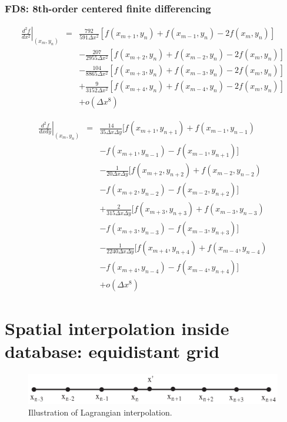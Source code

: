 \documentclass[11pt]{article}
\def\bea{\begin{eqnarray}}
\def\eea{\end{eqnarray}}
\begin{document}
\subsubsection*{FD8: 8th-order centered finite differencing}
\bea \left.\frac{d^2f}{dx^2}\right|_{(x_m,y_n)}
&=& \frac{792}{591\Delta
x^2}[f(x_{m+1},y_n)+f(x_{m-1},y_n)-2f(x_m,y_n)]\nonumber\\
&&-\frac{207}{2955\Delta
x^2}[f(x_{m+2},y_n)+f(x_{m-2},y_n)-2f(x_m,y_n)]\nonumber\\
&&-\frac{104}{8865\Delta
x^2}[f(x_{m+3},y_n)+f(x_{m-3},y_n)-2f(x_m,y_n)]\nonumber\\
&&+\frac{9}{3152\Delta
x^2}[f(x_{m+4},y_n)+f(x_{m-4},y_n)-2f(x_m,y_n)]\nonumber\\
&&+o(\Delta x^8) \eea

\bea \left.\frac{d^2f}{dxdy}\right|_{(x_m,y_n)} &=&
\frac{14}{35\Delta
x\Delta y}[f(x_{m+1},y_{n+1})+f(x_{m-1},y_{n-1})\nonumber\\
&&-f(x_{m+1},y_{n-1})-f(x_{m-1},y_{n+1})]\nonumber\\
&&-\frac{1}{20\Delta
x\Delta y}[f(x_{m+2},y_{n+2})+f(x_{m-2},y_{n-2})\nonumber\\
&&-f(x_{m+2},y_{n-2})-f(x_{m-2},y_{n+2})]\nonumber\\
&&+\frac{2}{315\Delta
x\Delta y}[f(x_{m+3},y_{n+3})+f(x_{m-3},y_{n-3})\nonumber\\
&&-f(x_{m+3},y_{n-3})-f(x_{m-3},y_{n+3})]\nonumber\\
&&-\frac{1}{2240\Delta
x\Delta y}[f(x_{m+4},y_{n+4})+f(x_{m-4},y_{n-4})\nonumber\\
&&-f(x_{m+4},y_{n-4})-f(x_{m-4},y_{n+4})]\nonumber\\
&&+o(\Delta x^8) \eea

\section{Spatial interpolation inside database: equidistant grid}
\label{sec:spa}
\begin{figure}[h]
\begin{minipage}{\linewidth}
\centering\includegraphics[width=1.0\linewidth]{Lagrangian.eps}
\end{minipage} \caption{Illustration of Lagrangian interpolation. }\label{Lagrangian}
\end{figure}
\end{document}
